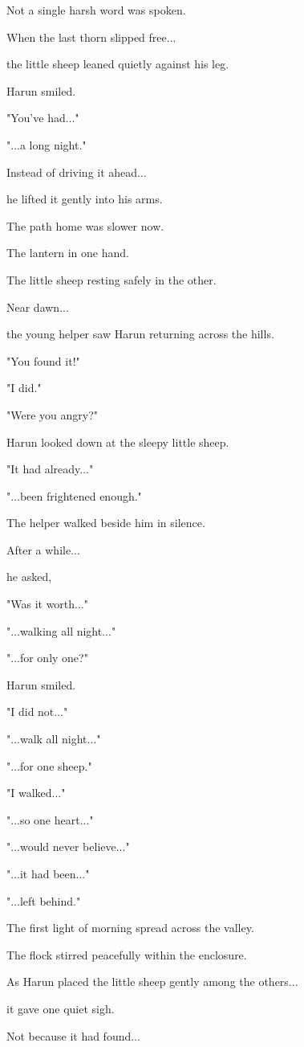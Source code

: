 \documentclass[12pt,openany]{book}
\begin{document}
Not a single harsh word was spoken.

When the last thorn slipped free...

the little sheep leaned quietly against his leg.

Harun smiled.

"You've had..."

"...a long night."

Instead of driving it ahead...

he lifted it gently into his arms.

The path home was slower now.

The lantern in one hand.

The little sheep resting safely in the other.

Near dawn...

the young helper saw Harun returning across the hills.

"You found it!"

"I did."

"Were you angry?"

Harun looked down at the sleepy little sheep.

"It had already..."

"...been frightened enough."

The helper walked beside him in silence.

After a while...

he asked,

"Was it worth..."

"...walking all night..."

"...for only one?"

Harun smiled.

"I did not..."

"...walk all night..."

"...for one sheep."

"I walked..."

"...so one heart..."

"...would never believe..."

"...it had been..."

"...left behind."

The first light of morning spread across the valley.

The flock stirred peacefully within the enclosure.

As Harun placed the little sheep gently among the others...

it gave one quiet sigh.

Not because it had found...
\end{document}

